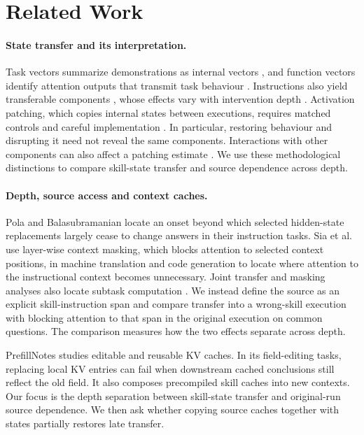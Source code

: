 \section{Related Work}
\label{sec:related}

\paragraph{State transfer and its interpretation.}
Task vectors summarize demonstrations as internal vectors
\citep{hendel2023taskvectors}, and function vectors identify attention
outputs that transmit task behaviour \citep{todd2024functionvectors}.
Instructions also yield transferable components
\citep{davidson2025prompting,bigoulaeva2026instructionvectors}, whose effects
vary with intervention depth \citep{jit2025taskrepr}. Activation patching,
which copies internal states between executions, requires matched controls
and careful implementation
\citep{zhang2023bestpractices,heimersheim2024patching}. In particular,
restoring behaviour and disrupting it need not reveal the same components.
Interactions with other components can also affect a patching estimate
\citep{vaidyanathan2026mediators}. We use these methodological distinctions to compare skill-state transfer
and source dependence across depth.

\paragraph{Depth, source access and context caches.}
Pola and Balasubramanian \citep{onset2025instruction} locate an onset beyond
which selected hidden-state replacements largely cease to change answers in their
instruction tasks. Sia et al.\ \citep{sia2024incontexttranslation} use
layer-wise context masking, which blocks attention to selected context
positions, in machine translation and code generation to
locate where attention to the instructional context becomes unnecessary.
Joint transfer and masking analyses also locate subtask computation
\citep{yang2025internalcot}. We instead define the source as an explicit
skill-instruction span and compare transfer into a wrong-skill execution
with blocking attention to that span in the original execution on common questions.
The comparison measures how the two effects separate across depth.

PrefillNotes \citep{li2026prefillnotes} studies editable and reusable KV
caches. In its field-editing tasks, replacing local KV entries can fail
when downstream cached conclusions still reflect the old field. It also
composes precompiled skill caches into new contexts. Our focus is the
depth separation between skill-state transfer and original-run source
dependence. We then ask whether copying source caches together with
states partially restores late transfer.

